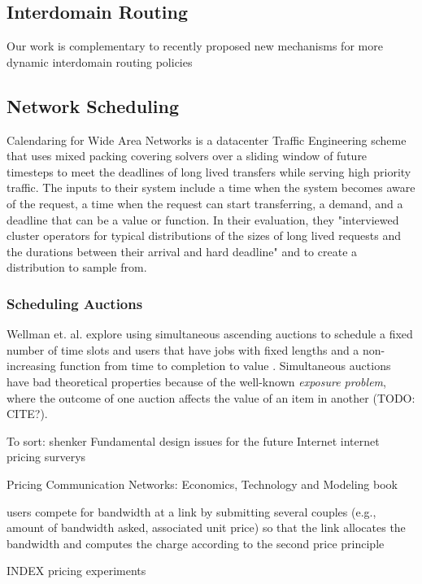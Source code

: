\subsection{Interdomain Routing}
Our work is complementary to recently proposed new mechanisms for more dynamic interdomain routing policies



\subsection{Network Scheduling}
Calendaring for Wide Area Networks \cite{tempus14}
is a datacenter Traffic Engineering scheme that uses mixed packing covering solvers over a sliding window of future timesteps to meet the deadlines of long lived transfers while serving high priority traffic.
The inputs to their system include a time when the system becomes aware of the request, a time when the request can start transferring, a demand, and a deadline that can be a value or function.
In their evaluation, they "interviewed cluster operators for typical distributions of the sizes of long lived requests and the durations between their arrival and hard deadline" and to create a distribution to sample from.

\subsubsection{Scheduling Auctions}
Wellman et. al. explore using simultaneous ascending auctions to schedule a fixed number of time slots and users that have jobs with fixed lengths and a non-increasing function from time to completion to value \cite{wellman01, wellman05}.
Simultaneous auctions have bad theoretical properties because of the well-known \emph{exposure problem}, where the outcome of one auction affects the value of an item in another (TODO: CITE?).


To sort:
shenker Fundamental design issues for the future Internet \cite{shenker95}
internet pricing surverys\cite{stiller01, falkner00, odlyzko01}

Pricing Communication Networks: Economics, Technology and Modeling book \cite{courcoubetis03}

users compete for bandwidth at a link by submitting several couples (e.g., amount of bandwidth asked, associated unit price) so that the link allocates the bandwidth and computes the charge according to the second price principle \cite{maille06}


INDEX pricing experiments \cite{altmann99, edell99}

